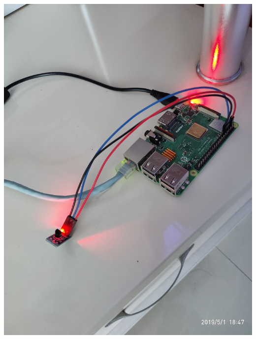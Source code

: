 \begin{frame}
\begin{columns}
        \includegraphics[width=\linewidth]{Assets/raspberrypi-with-DS18B20.jpg}
    \end{columns}
\end{frame}
